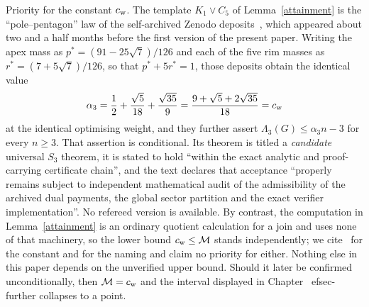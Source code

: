 \begin{remark}\label{rem-newton}
Priority for the constant $c_{\mathrm{w}}$. The template $K_1\vee C_5$ of
Lemma~\ref{attainment} is the ``pole--pentagon'' law of the self-archived
Zenodo deposits~\cite{Newton1,Newton2}, which appeared about two and a half
months before the first version of the present paper. Writing the apex mass
as $p^*=(91-25\sqrt7)/126$ and each of the five rim masses as
$r^*=(7+5\sqrt7)/126$, so that $p^*+5r^*=1$, those deposits obtain the
identical value
\[
 \alpha_3=\frac12+\frac{\sqrt5}{18}+\frac{\sqrt{35}}9
        =\frac{9+\sqrt5+2\sqrt{35}}{18}=c_{\mathrm{w}}
\]
at the identical optimising weight, and they further assert
$\Lambda_3(G)\le\alpha_3n-3$ for every $n\ge3$. That assertion is
conditional. Its theorem is titled a \emph{candidate} universal $S_3$
theorem, it is stated to hold ``within the exact analytic and
proof-carrying certificate chain'', and the text declares that acceptance
``properly remains subject to independent mathematical audit of the
admissibility of the archived dual payments, the global sector partition and
the exact verifier implementation''. No refereed version is available. By
contrast, the computation in Lemma~\ref{attainment} is an ordinary quotient
calculation for a join and uses none of that machinery, so the lower bound
$c_{\mathrm{w}}\le\mathcal M$ stands independently; we cite~\cite{Newton1,Newton2}
for the constant and for the naming and claim no priority for either.
Nothing else in this paper depends on the unverified upper bound. Should it
later be confirmed unconditionally, then $\mathcal M=c_{\mathrm{w}}$ and the
interval displayed in Chapter~
ef{sec-further} collapses to a point.
\end{remark}

